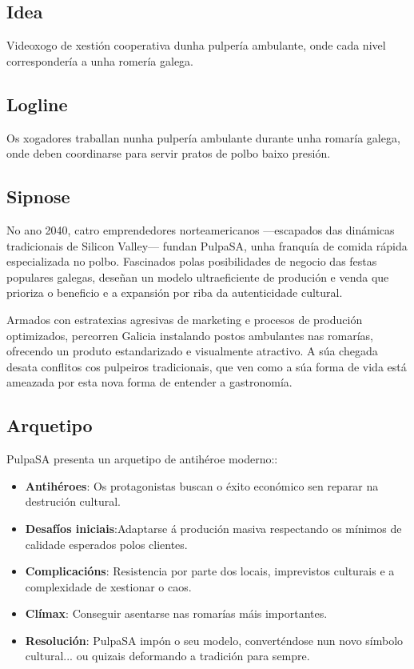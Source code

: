\documentclass{report}  %
\begin{document}
\subsection{Idea}

Videoxogo de xestión cooperativa dunha pulpería ambulante, onde cada nivel correspondería a unha romería galega.

\subsection{Logline}

Os xogadores traballan nunha pulpería ambulante durante unha romaría galega, onde deben coordinarse para servir pratos de polbo baixo presión.

\subsection{Sipnose}

No ano 2040, catro emprendedores norteamericanos —escapados das dinámicas tradicionais de Silicon Valley— fundan PulpaSA, unha franquía de comida rápida especializada no polbo. Fascinados polas posibilidades de negocio das festas populares galegas, deseñan un modelo ultraeficiente de produción e venda que prioriza o beneficio e a expansión por riba da autenticidade cultural.

Armados con estratexias agresivas de marketing e procesos de produción optimizados, percorren Galicia instalando postos ambulantes nas romarías, ofrecendo un produto estandarizado e visualmente atractivo. A súa chegada desata conflitos cos pulpeiros tradicionais, que ven como a súa forma de vida está ameazada por esta nova forma de entender a gastronomía.

\subsection{Arquetipo}

PulpaSA presenta un arquetipo de antihéroe moderno::
\begin{itemize}
    \item \textbf{Antihéroes}: Os protagonistas buscan o éxito económico sen reparar na destrución cultural.
    \item \textbf{Desafíos iniciais}:Adaptarse á produción masiva respectando os mínimos de calidade esperados polos clientes.
    \item \textbf{Complicacións}: Resistencia por parte dos locais, imprevistos culturais e a complexidade de xestionar o caos.
    \item \textbf{Clímax}: Conseguir asentarse nas romarías máis importantes.
    \item \textbf{Resolución}: PulpaSA impón o seu modelo, converténdose nun novo símbolo cultural... ou quizais deformando a tradición para sempre.
\end{itemize}
\end{document}
